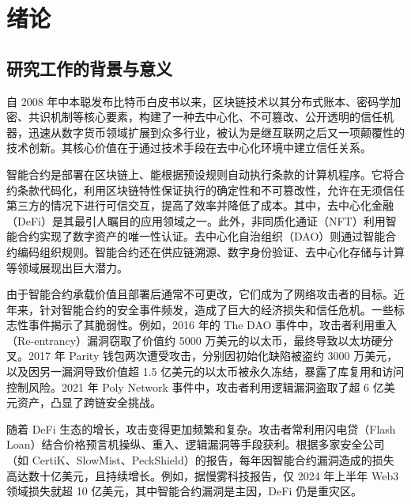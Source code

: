 \documentclass[print, master, vlined, timesmath]{DissertUESTC}
\begin{document}

\tableofcontents  

\chapter{绪\hspace{6pt}论}

\section{研究工作的背景与意义}

自 2008 年中本聪发布比特币白皮书\cite{}以来，区块链技术以其分布式账本、密码学加密、共识机制等核心要素，构建了一种去中心化、不可篡改、公开透明的信任机器，迅速从数字货币领域扩展到众多行业，被认为是继互联网之后又一项颠覆性的技术创新\cite{}。其核心价值在于通过技术手段在去中心化环境中建立信任关系。

智能合约是部署在区块链上、能根据预设规则自动执行条款的计算机程序。它将合约条款代码化，利用区块链特性保证执行的确定性和不可篡改性，允许在无须信任第三方的情况下进行可信交互，提高了效率并降低了成本。其中，去中心化金融（DeFi）\cite{}是其最引人瞩目的应用领域之一。此外，非同质化通证（NFT）\cite{}利用智能合约实现了数字资产的唯一性认证。去中心化自治组织（DAO）\cite{}则通过智能合约编码组织规则。智能合约还在供应链溯源\cite{}、数字身份验证\cite{}、去中心化存储与计算\cite{}等领域展现出巨大潜力。

由于智能合约承载价值且部署后通常不可更改，它们成为了网络攻击者的目标。近年来，针对智能合约的安全事件频发，造成了巨大的经济损失和信任危机。一些标志性事件揭示了其脆弱性。例如，2016 年的 The DAO 事件中，攻击者利用重入（Re-entrancy）漏洞\cite{}窃取了价值约 5000 万美元的以太币，最终导致以太坊硬分叉\cite{}。2017 年 Parity 钱包两次遭受攻击，分别因初始化缺陷被盗约 3000 万美元\cite{}，以及因另一漏洞导致价值超 1.5 亿美元的以太币被永久冻结\cite{}，暴露了库复用和访问控制风险。2021 年 Poly Network 事件中，攻击者利用逻辑漏洞盗取了超 6 亿美元资产\cite{}，凸显了跨链安全挑战。

随着 DeFi 生态的增长，攻击变得更加频繁和复杂。攻击者常利用闪电贷（Flash Loan）\cite{}结合价格预言机操纵\cite{}、重入、逻辑漏洞等手段获利\cite{}。根据多家安全公司（如 CertiK\cite{}、SlowMist\cite{}、PeckShield\cite{}）的报告，每年因智能合约漏洞造成的损失高达数十亿美元，且持续增长。例如，据慢雾科技报告，仅 2024 年上半年 Web3 领域损失就超 10 亿美元\cite{}，其中智能合约漏洞是主因，DeFi 仍是重灾区。
\end{document}

